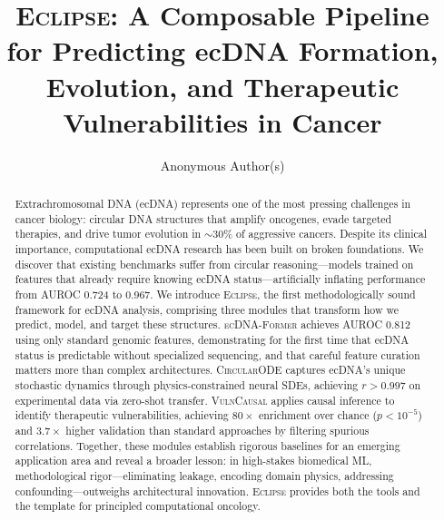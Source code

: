 \documentclass[runningheads]{llncs}
\newcommand{\eclipse}{\textsc{Eclipse}}
\newcommand{\former}{\textsc{ecDNA-Former}}
\newcommand{\circularode}{\textsc{CircularODE}}
\newcommand{\vulncausal}{\textsc{VulnCausal}}
\begin{document}
\title{\eclipse{}: A Composable Pipeline for Predicting ecDNA Formation, Evolution, and Therapeutic Vulnerabilities in Cancer}


\author{Anonymous Author(s)}


\maketitle

\begin{abstract}
Extrachromosomal DNA (ecDNA) represents one of the most pressing challenges in cancer biology: circular DNA structures that amplify oncogenes, evade targeted therapies, and drive tumor evolution in $\sim$30\% of aggressive cancers. Despite its clinical importance, computational ecDNA research has been built on broken foundations. We discover that existing benchmarks suffer from circular reasoning---models trained on features that already require knowing ecDNA status---artificially inflating performance from AUROC 0.724 to 0.967. We introduce \eclipse{}, the first methodologically sound framework for ecDNA analysis, comprising three modules that transform how we predict, model, and target these structures. \former{} achieves AUROC 0.812 using only standard genomic features, demonstrating for the first time that ecDNA status is predictable without specialized sequencing, and that careful feature curation matters more than complex architectures. \circularode{} captures ecDNA's unique stochastic dynamics through physics-constrained neural SDEs, achieving $r > 0.997$ on experimental data via zero-shot transfer. \vulncausal{} applies causal inference to identify therapeutic vulnerabilities, achieving $80\times$ enrichment over chance ($p < 10^{-5}$) and $3.7\times$ higher validation than standard approaches by filtering spurious correlations. Together, these modules establish rigorous baselines for an emerging application area and reveal a broader lesson: in high-stakes biomedical ML, methodological rigor---eliminating leakage, encoding domain physics, addressing confounding---outweighs architectural innovation. \eclipse{} provides both the tools and the template for principled computational oncology.

\end{abstract}
\end{document}
